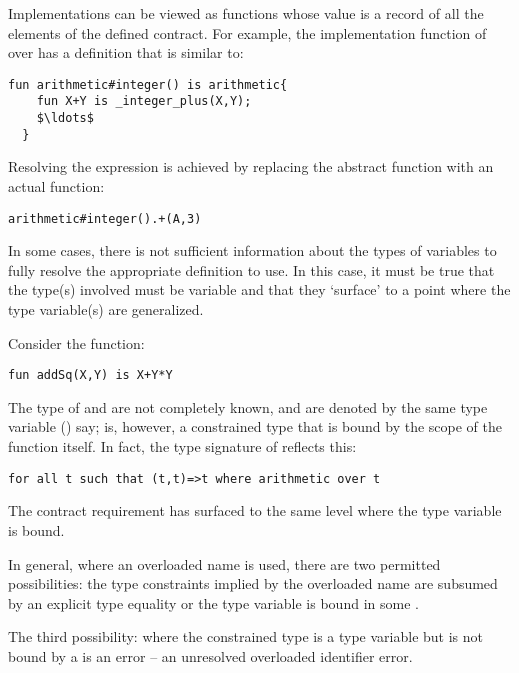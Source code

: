 Implementations can be viewed as functions whose value is a record of all the elements of the defined contract. For example, the implementation function of  over  has a definition that is similar to:
\begin{lstlisting}[mathescape=true]
fun arithmetic#integer() is arithmetic{
    fun X+Y is _integer_plus(X,Y);
    $\ldots$
  }
\end{lstlisting}

Resolving the expression  is achieved by replacing the abstract function \q{(+)} with an actual function:
\begin{lstlisting}
arithmetic#integer().+(A,3)
\end{lstlisting}

In some cases, there is not sufficient information about the types of variables to fully resolve the appropriate definition to use. In this case, it must be true that the type(s) involved must be variable and that they `surface' to a point where the type variable(s) are generalized.

Consider the function:
\begin{lstlisting}
fun addSq(X,Y) is X+Y*Y
\end{lstlisting}

The type of  and  are not completely known, and are denoted by the same type variable () say;  is, however, a constrained type that is bound by the scope of the  function itself. In fact, the type signature of  reflects this:
\begin{lstlisting}
for all t such that (t,t)=>t where arithmetic over t
\end{lstlisting}
The  contract requirement has surfaced to the same level where the type variable  is bound.

In general, where an overloaded name is used, there are two permitted possibilities: the type constraints implied by the overloaded name are subsumed by an explicit type equality or the type variable is bound in some .

\begin{aside}
The third possibility: where the constrained type is a type variable but is not bound by a  is an error -- an unresolved overloaded identifier error.
\end{aside}

